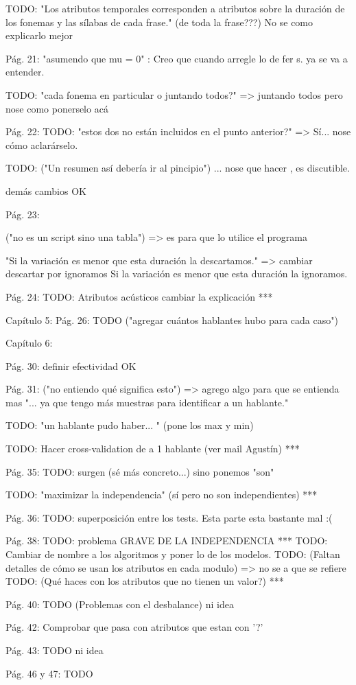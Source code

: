 TODO: "Los atributos temporales corresponden a atributos sobre la duración de los fonemas y las sílabas de cada frase." (de toda la frase???) No se como explicarlo mejor

Pág. 21:
"asumendo que mu = 0" : Creo que cuando arregle lo de fer s. ya se va a entender.

TODO: "cada fonema en particular o juntando todos?" => juntando todos pero nose como ponerselo acá

Pág. 22:
TODO: "estos dos no están incluidos en el punto anterior?" => Sí... nose cómo aclarárselo.

TODO: ("Un resumen así debería ir al pincipio") ... nose que hacer , es discutible.

demás cambios OK

Pág. 23:

("no es un script sino una tabla") => es para que lo utilice el programa

"Si la variación es menor que esta duración la descartamos." => cambiar descartar por ignoramos
Si la variación es menor que esta duración la ignoramos.


Pág. 24:
TODO: Atributos acústicos cambiar la explicación ***

Capítulo 5:
Pág. 26: TODO ("agregar cuántos hablantes hubo para cada caso")

Capítulo 6:

Pág. 30: definir efectividad OK

Pág. 31: ("no entiendo qué significa esto") => agrego algo para que se entienda mas
"... ya que tengo más muestras para identificar a un hablante."

TODO: "un hablante pudo haber... " (pone los max y min)

TODO: Hacer cross-validation de a 1 hablante (ver mail Agustín) *** 

Pág. 35:
TODO: surgen (sé más concreto...) sino ponemos "son"

TODO: "maximizar la independencia" (sí pero no son independientes) ***

Pág. 36:
TODO: superposición entre los tests. Esta parte esta bastante mal :(

Pág. 38: 
TODO: problema GRAVE DE LA INDEPENDENCIA ***
TODO: Cambiar de nombre a los algoritmos y poner lo de los modelos.
TODO: (Faltan detalles de cómo se usan los atributos en cada modulo) => no se a que se refiere
TODO: (Qué haces con los atributos que no tienen un valor?) ***

Pág. 40:
TODO (Problemas con el desbalance) ni idea

Pág. 42:
Comprobar que pasa con atributos que estan con '?'

Pág. 43: TODO ni idea

Pág. 46 y 47: TODO 

